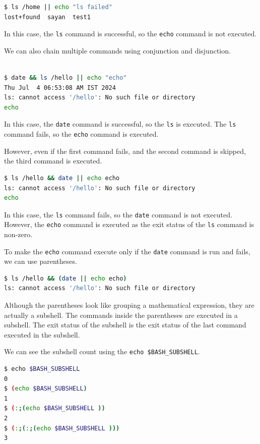 \begin{lstlisting}[language=bash]
$ ls /home || echo "ls failed"
lost+found  sayan  test1
\end{lstlisting}

In this case, the \lstinline|ls| command is successful, so the \lstinline|echo|
command is not executed.

We can also chain multiple commands using conjunction and disjunction.

\begin{lstlisting}[language=bash]

$ date && ls /hello || echo "echo"
Thu Jul  4 06:53:08 AM IST 2024
ls: cannot access '/hello': No such file or directory
echo
\end{lstlisting}

In this case, the \lstinline|date| command is successful, so the \lstinline|ls|
is executed. The \lstinline|ls| command fails, so the \lstinline|echo| command
is executed.

However, even if the first command fails, and the second command is
skipped, the third command is executed.

\begin{lstlisting}[language=bash]
$ ls /hello && date || echo echo
ls: cannot access '/hello': No such file or directory
echo
\end{lstlisting}

In this case, the \lstinline|ls| command fails, so the \lstinline|date| command
is not executed. However, the \lstinline|echo| command is executed as the
exit status of the \lstinline|ls| command is non-zero.

To make the \lstinline|echo| command execute only if the \lstinline|date|
command is run and fails, we can use parentheses.

\begin{lstlisting}[language=bash]
$ ls /hello && (date || echo echo)
ls: cannot access '/hello': No such file or directory
\end{lstlisting}

Although the parentheses look like grouping a mathematical expression,
they are actually a subshell. The commands inside the parentheses
are executed in a subshell. The exit status of the subshell is the
exit status of the last command executed in the subshell.

We can see the subshell count using the \lstinline|echo $BASH_SUBSHELL|.

\begin{lstlisting}[language=bash]
$ echo $BASH_SUBSHELL
0
$ (echo $BASH_SUBSHELL)
1
$ (:;(echo $BASH_SUBSHELL ))
2
$ (:;(:;(echo $BASH_SUBSHELL )))
3
\end{lstlisting}

